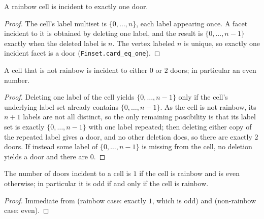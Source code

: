 \begin{lemma}
    \label{lem:cell-door-rainbow}
    \leanok
    A rainbow cell is incident to exactly one door.
\end{lemma}
\begin{proof}
    The cell's label multiset is $\{0, \dots, n\}$, each label appearing once.
    A facet incident to it is obtained by deleting one label, and the result is
    $\{0, \dots, n-1\}$ exactly when the deleted label is $n$. The vertex labeled
    $n$ is unique, so exactly one incident facet is a door
    (\texttt{Finset.card\_eq\_one}).
\end{proof}

\begin{lemma}
    \label{lem:cell-door-nonrainbow}
    A cell that is not rainbow is incident to either $0$ or $2$ doors; in
    particular an even number.
\end{lemma}
\begin{proof}
    Deleting one label of the cell yields $\{0, \dots, n-1\}$ only if the cell's
    underlying label set already contains $\{0, \dots, n-1\}$. As the cell is not
    rainbow, its $n+1$ labels are not all distinct, so the only remaining
    possibility is that its label set is exactly $\{0, \dots, n-1\}$ with one
    label repeated; then deleting either copy of the repeated label gives a door,
    and no other deletion does, so there are exactly $2$ doors. If instead some
    label of $\{0, \dots, n-1\}$ is missing from the cell, no deletion yields a
    door and there are $0$.
\end{proof}

\begin{lemma}
    \label{lem:cell-door-count}
    \leanok
    The number of doors incident to a cell is $1$ if the cell is rainbow and is
    even otherwise; in particular it is odd if and only if the cell is rainbow.
\end{lemma}
\begin{proof}
    Immediate from  (rainbow case: exactly $1$, which
    is odd) and  (non-rainbow case: even).
\end{proof}

